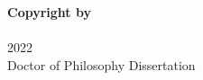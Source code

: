 \begin{center}
    \textbf{Copyright by}\\
    \myname\\
    \vfill
    2022\\
    Doctor of Philosophy Dissertation
\end{center}
\clearpage